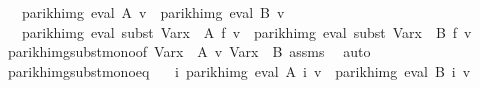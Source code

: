 \begin{isabellebody}
\ \ \ {\isachardoublequoteopen}parikh{\isacharunderscore}{\kern0pt}img\ {\isacharparenleft}{\kern0pt}eval\ A\ v{\isacharparenright}{\kern0pt}\ {\isasymsubseteq}\ parikh{\isacharunderscore}{\kern0pt}img\ {\isacharparenleft}{\kern0pt}eval\ B\ v{\isacharparenright}{\kern0pt}{\isachardoublequoteclose}\isanewline
\ \ \ {\isachardoublequoteopen}parikh{\isacharunderscore}{\kern0pt}img\ {\isacharparenleft}{\kern0pt}eval\ {\isacharparenleft}{\kern0pt}subst\ {\isacharparenleft}{\kern0pt}Var{\isacharparenleft}{\kern0pt}x\ {\isacharcolon}{\kern0pt}{\isacharequal}{\kern0pt}\ A{\isacharparenright}{\kern0pt}{\isacharparenright}{\kern0pt}\ f{\isacharparenright}{\kern0pt}\ v{\isacharparenright}{\kern0pt}\ {\isasymsubseteq}\ parikh{\isacharunderscore}{\kern0pt}img\ {\isacharparenleft}{\kern0pt}eval\ {\isacharparenleft}{\kern0pt}subst\ {\isacharparenleft}{\kern0pt}Var{\isacharparenleft}{\kern0pt}x\ {\isacharcolon}{\kern0pt}{\isacharequal}{\kern0pt}\ B{\isacharparenright}{\kern0pt}{\isacharparenright}{\kern0pt}\ f{\isacharparenright}{\kern0pt}\ v{\isacharparenright}{\kern0pt}{\isachardoublequoteclose}\isanewline
%
\isadelimproof
\ \ %
\endisadelimproof
%
\isatagproof
{}\isamarkupfalse%
\ parikh{\isacharunderscore}{\kern0pt}img{\isacharunderscore}{\kern0pt}subst{\isacharunderscore}{\kern0pt}mono{\isacharbrackleft}{\kern0pt}of\ {\isachardoublequoteopen}Var{\isacharparenleft}{\kern0pt}x\ {\isacharcolon}{\kern0pt}{\isacharequal}{\kern0pt}\ A{\isacharparenright}{\kern0pt}{\isachardoublequoteclose}\ v\ {\isachardoublequoteopen}Var{\isacharparenleft}{\kern0pt}x\ {\isacharcolon}{\kern0pt}{\isacharequal}{\kern0pt}\ B{\isacharparenright}{\kern0pt}{\isachardoublequoteclose}{\isacharbrackright}{\kern0pt}\ assms\ \isamarkupfalse%
\ auto%
\endisatagproof
{\isafoldproof}%
%
\isadelimproof
\isanewline
%
\endisadelimproof
\isanewline
{}\isamarkupfalse%
\ parikh{\isacharunderscore}{\kern0pt}img{\isacharunderscore}{\kern0pt}subst{\isacharunderscore}{\kern0pt}mono{\isacharunderscore}{\kern0pt}eq{\isacharcolon}{\kern0pt}\isanewline
\ \ \ {\isachardoublequoteopen}{\isasymforall}i{\isachardot}{\kern0pt}\ parikh{\isacharunderscore}{\kern0pt}img\ {\isacharparenleft}{\kern0pt}eval\ {\isacharparenleft}{\kern0pt}A\ i{\isacharparenright}{\kern0pt}\ v{\isacharparenright}{\kern0pt}\ {\isacharequal}{\kern0pt}\ parikh{\isacharunderscore}{\kern0pt}img\ {\isacharparenleft}{\kern0pt}eval\ {\isacharparenleft}{\kern0pt}B\ i{\isacharparenright}{\kern0pt}\ v{\isacharparenright}{\kern0pt}{\isachardoublequoteclose}\isanewline

\end{isabellebody}

